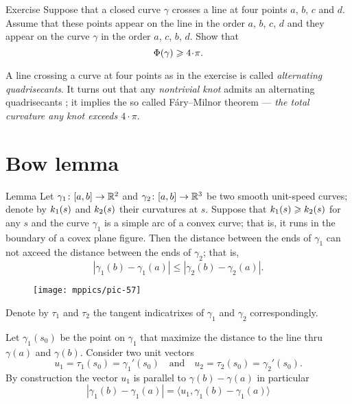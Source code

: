\begin{thm}{Exercise}\label{ex:quadrisecant}
Suppose that a closed curve $\gamma$ crosses a line at four points $a$, $b$, $c$ and $d$.
Assume that these points appear on the line in the order $a$, $b$, $c$, $d$
and they appear on the curve $\gamma$ in the order $a$, $c$, $b$, $d$.
Show that 
\[\tc\gamma\ge 4\cdot\pi.\]

\end{thm}

A line crossing a curve at four points as in the exercise is called \emph{alternating quadrisecants}.
It turns out that any \emph{nontrivial knot} admits an alternating quadrisecants \cite{denne};
it implies the so called F\'ary--Milnor theorem --- \emph{the total curvature any knot exceeds $4\cdot \pi$}.

\section*{Bow lemma}

\begin{thm}{Lemma}\label{lem:bow}
Let $\gamma_1\colon[a,b]\to\mathbb{R}^2$ and $\gamma_2\colon[a,b] \to\mathbb{R}^3$ be two smooth unit-speed curves;
denote by $k_1(s)$ and $k_2(s)$ their curvatures at $s$.
Suppose that $k_1(s)\geqslant k_2(s)$ for any $s$ 
and the curve
$\gamma_1$ is a simple arc of a convex curve; that is, it runs in the boundary of a covex plane figure.
Then the distance between the ends of $\gamma_1$ can not axceed the  distance between the ends of $\gamma_2$; that is,
\[|\gamma_1(b)-\gamma_1(a)|\le |\gamma_2(b)-\gamma_2(a)|.\]

\end{thm}

\begin{wrapfigure}{r}{36 mm}
\vskip-7mm
\centering
\texttt{[image: mppics/pic-57]}
\vskip0mm
\end{wrapfigure}

Denote by $\tau_1$ and $\tau_2$ the tangent indicatrixes of $\gamma_1$ and $\gamma_2$ correspondingly.

Let $\gamma_1(s_0)$ be the point on $\gamma_1$ that maximize the distance to the line 
thru $\gamma(a)$ and $\gamma(b)$.
Consider two unit vectors 
\[u_1=\tau_1(s_0)=\gamma_1'(s_0)
\quad\text{and}\quad
u_2=\tau_2(s_0)=\gamma_2'(s_0).\]
By construction the vector $u_1$ is parallel to $\gamma(b)-\gamma(a)$ in particular
\[|\gamma_1(b)-\gamma_1(a)|=\langle u_1,\gamma_1(b)-\gamma_1(a)\rangle \]

